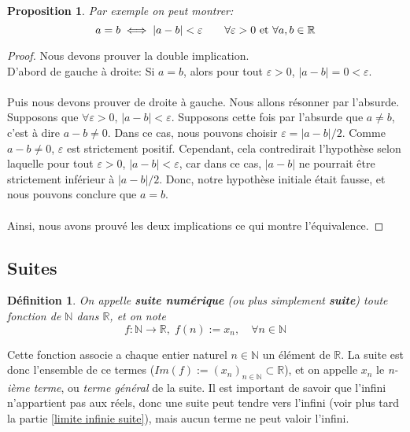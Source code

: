 \documentclass[a4paper, 12pt, french, twoside]{article}
\newtheorem{proposition}[theorem]{Proposition}
\newtheorem{defi}[theorem]{Définition}
\newcommand{\Nn}{{\mathbb{N}}}
\newcommand{\Rr}{{\mathbb{R}}}
\begin{document}
\begin{proposition}
    Par exemple on peut montrer:
\begin{equation}
    a=b \iff |a-b|<\varepsilon \qquad \forall \varepsilon>0 {\,\, \rm et\,\, }\forall a,b \in \Rr
\end{equation}
\end{proposition}
\begin{proof}
    Nous devons prouver la double implication. \\D'abord de gauche à droite: Si $a=b$, alors pour tout $\varepsilon>0$, $|a-b|=0<\varepsilon$.
\\ \\Puis nous devons prouver de droite à gauche. Nous allons résonner par l'absurde. Supposons que $\forall \varepsilon>0$, $|a-b|<\varepsilon$. Supposons cette fois par l'absurde que $a\neq b$, c'est à dire $a-b\neq0$. Dans ce cas, nous pouvons choisir $\varepsilon = |a-b|/2$. Comme $a-b\neq 0$, $\varepsilon$ est strictement positif. Cependant, cela contredirait l'hypothèse selon laquelle pour tout $\varepsilon >0$, $|a-b|<\varepsilon$, car dans ce cas, $|a-b|$ ne pourrait être strictement inférieur à $|a-b|/2$. Donc, notre hypothèse initiale était fausse, et nous pouvons conclure que $a=b$.
\\ \\Ainsi, nous avons prouvé les deux implications ce qui montre l'équivalence.

\end{proof}




\subsection{Suites}
\begin{defi}
On appelle \textbf{suite numérique} (ou plus simplement \textbf{suite}) toute fonction de $\Nn$ dans $\Rr$, et on note 
\begin{equation}
    f: \Nn\longrightarrow\Rr,\; f(n):=x_n, \quad \forall n\in \Nn
\end{equation}
\end{defi}

Cette fonction associe a chaque entier naturel $n\in\Nn$ un élément de $\Rr$. La suite est donc l'ensemble de ce termes ($Im(f):=(x_n)_{n\in\Nn}\subset \Rr$), et on appelle $x_n$ le \textit{n-ième terme}, ou \textit{terme général} de la suite. Il est important de savoir que l'infini n'appartient pas aux réels, donc une suite peut tendre vers l'infini (voir plus tard la partie \ref{limite infinie suite}), mais aucun terme ne peut valoir l'infini.\\
\end{document}
